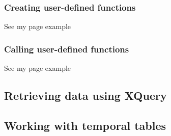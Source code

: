 \documentclass{article}
\begin{document}
\subsubsection{Creating user-defined functions}
See my page example
\subsubsection{Calling user-defined functions}
See my page example

\subsection{Retrieving data using XQuery}

\subsection{Working with temporal tables}

%
%
\end{document}
